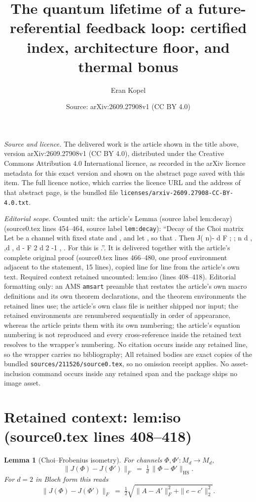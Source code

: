 \documentclass[10pt,a4paper]{amsart}
\title[The quantum lifetime of a future-referential feedback loop: certified index, architecture floor, and thermal bonus]{The quantum lifetime of a future-referential feedback loop: certified index, architecture floor, and thermal bonus}
\author{Eran Kopel}
\date{Source: arXiv:2609.27908v1 (CC BY 4.0)}
\theoremstyle{plain}
\newtheorem{lemma}[theorem]{Lemma}
\theoremstyle{definition}
\theoremstyle{remark}
\begin{document}
\maketitle

\noindent\emph{Source and licence.} The delivered work is the article shown in the title above, version arXiv:2609.27908v1 (CC BY 4.0), distributed under the Creative Commons Attribution 4.0 International licence, as recorded in the arXiv licence metadata for this exact version and shown on the abstract page saved with this item. The full licence notice, which carries the licence URL and the address of that abstract page, is the bundled file \texttt{licenses/arxiv-2609.27908-CC-BY-4.0.txt}.
\par\smallskip

\noindent\textit{Editorial scope.} Counted unit: the article's Lemma (source label lem:decay) (source0.tex lines 454--464, source label \texttt{lem:decay}): ``Decay of the Choi matrix Let be a channel with fixed state and , and let , so that . Then J( n)- d F ; ; n d , ,d , d - F 2 d 2 -1 , . For this is .''. It is delivered together with the article's complete original proof (source0.tex lines 466--480, one proof environment adjacent to the statement, 15 lines), copied line for line from the article's own text. Required context retained uncounted: lem:iso (lines 408--418). Editorial formatting only: an AMS \texttt{amsart} preamble that restates the article's own macro definitions and its own theorem declarations, and the theorem environments the retained lines use; the article's own class file is neither shipped nor input; the retained environments are renumbered sequentially in order of appearance, whereas the article prints them with its own numbering; the article's equation numbering is not reproduced and every cross-reference inside the retained text resolves to the wrapper's numbering. No citation occurs inside any retained line, so the wrapper carries no bibliography; All retained bodies are exact copies of the bundled \texttt{sources/211526/source0.tex}, so no omission receipt applies. No asset-inclusion command occurs inside any retained span and the package ships no image asset.


\section*{Retained context: lem:iso (source0.tex lines 408--418)}

\begin{lemma}[Choi--Frobenius isometry]\label{lem:iso}
For channels $\Phi,\Phi':M_d\to M_d$,
\begin{equation}
  \bigl\|J(\Phi)-J(\Phi')\bigr\|_F \;=\; \tfrac1d\,\|\Phi-\Phi'\|_{\mathrm{HS}} .
\end{equation}
For $d=2$ in Bloch form this reads
\begin{equation}\label{eq:iso2}
  \bigl\|J(\Phi)-J(\Phi')\bigr\|_F
  \;=\; \tfrac12\sqrt{\|A-A'\|_F^{2}+\|c-c'\|_2^{2}} .
\end{equation}
\end{lemma}
\end{document}
